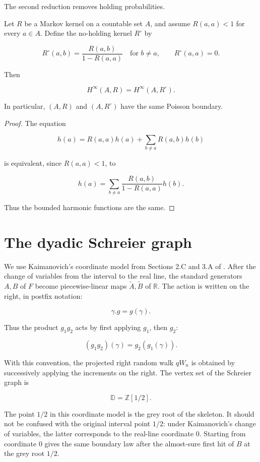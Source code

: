 \documentclass[11pt,a4paper]{scrartcl}
\begin{document}
The second reduction removes holding probabilities.

\begin{lemma}\label{lem:no-holding}
Let \(R\) be a Markov kernel on a countable set \(A\), and
assume \(R(a,a)<1\) for every \(a\in A\). Define the no-holding kernel
\(R^\circ\) by

\[
R^\circ(a,b)=\frac{R(a,b)}{1-R(a,a)}
\quad\text{for }b\ne a,
\qquad
R^\circ(a,a)=0 .
\]

Then

\[
H^\infty(A,R)=H^\infty(A,R^\circ).
\]

In particular, \((A,R)\) and \((A,R^\circ)\) have the same Poisson boundary.

\end{lemma}
\begin{proof}
The equation

\[
h(a)=R(a,a)h(a)+\sum_{b\ne a}R(a,b)h(b)
\]

is equivalent, since \(R(a,a)<1\), to

\[
h(a)=\sum_{b\ne a}\frac{R(a,b)}{1-R(a,a)}h(b).
\]

Thus the bounded harmonic functions are the same.
\end{proof}


\section{The dyadic Schreier graph}\label{sec:the-dyadic-schreier-graph}


We use Kaimanovich's coordinate model from Sections 2.C and 3.A of
\cite{Kaimanovich2017}. After the change of variables from the interval to the
real line, the standard generators \(A,B\) of \(F\) become piecewise-linear
maps \(\widetilde A,\widetilde B\) of \(\mathbb R\). The action is written on
the right, in postfix notation:

\[
\gamma.g=g(\gamma).
\]

Thus the product \(g_1g_2\) acts by first applying \(g_1\), then \(g_2\):

\[
(g_1g_2)(\gamma)=g_2(g_1(\gamma)).
\]

With this convention, the projected right random walk \(qW_n\) is obtained by
successively applying the increments on the right. The vertex set of the
Schreier graph is

\[
\mathbb D=\mathbb Z[1/2].
\]

The point \(1/2\) in this coordinate model is the grey root of the skeleton.
It should not be confused with the original interval point \(1/2\): under
Kaimanovich's change of variables, the latter corresponds to the real-line
coordinate \(0\). Starting from coordinate \(0\) gives the same boundary law
after the almost-sure first hit of \(B\) at the grey root \(1/2\).
\end{document}
